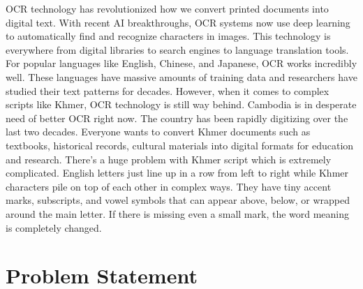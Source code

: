 OCR technology has revolutionized how we convert printed 
documents into digital text. With recent AI breakthroughs, 
OCR systems now use deep learning to automatically find and 
recognize characters in images. This technology is everywhere from digital libraries to search engines to language translation tools.
For popular languages like English, Chinese, and Japanese, 
OCR works incredibly well. These languages have massive 
amounts of training data and researchers have studied 
their text patterns for decades. However, when it comes to 
complex scripts like Khmer, OCR technology is still way behind.
Cambodia is in desperate need of better OCR right now. 
The country has been rapidly digitizing over the last 
two decades. Everyone wants to convert Khmer documents such as
textbooks, historical records, cultural materials 
into digital formats for education and research.
There's a huge problem with Khmer script which is extremely complicated.
English letters just line up in 
a row from left to right while Khmer characters pile on top 
of each other in complex ways. They have tiny accent 
marks, subscripts, and vowel symbols that can appear 
above, below, or wrapped around the main letter. If 
there is missing even a small mark, the word meaning 
is completely changed.
\begin{table}[H]
    \caption{Why Khmer OCR is Desperately Needed}
    \vspace{10pt}
    \label{sec:textbook}
\end{table}




\section{Problem Statement}
\label{sec:problem}


